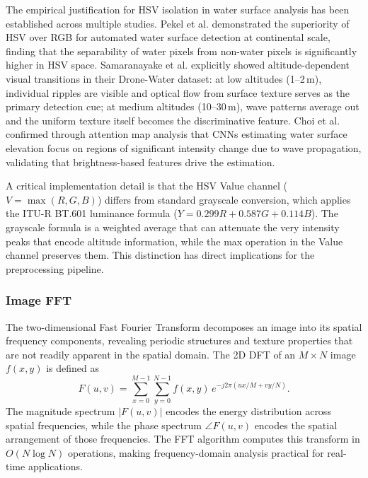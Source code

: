     The empirical justification for HSV isolation in water surface analysis has been established across multiple studies. Pekel et al. \cite{Pekel2016} demonstrated the superiority of HSV over RGB for automated water surface detection at continental scale, finding that the separability of water pixels from non-water pixels is significantly higher in HSV space. Samaranayake et al. \cite{SAMARANAYAKE2023103933} explicitly showed altitude-dependent visual transitions in their Drone-Water dataset: at low altitudes (1--2\,m), individual ripples are visible and optical flow from surface texture serves as the primary detection cue; at medium altitudes (10--30\,m), wave patterns average out and the uniform texture itself becomes the discriminative feature. Choi et al. \cite{CHEN2022110819} confirmed through attention map analysis that CNNs estimating water surface elevation focus on regions of significant intensity change due to wave propagation, validating that brightness-based features drive the estimation.

    A critical implementation detail is that the HSV Value channel ($V = \max(R, G, B)$) differs from standard grayscale conversion, which applies the ITU-R BT.601 luminance formula ($Y = 0.299R + 0.587G + 0.114B$). The grayscale formula is a weighted average that can attenuate the very intensity peaks that encode altitude information, while the max operation in the Value channel preserves them. This distinction has direct implications for the preprocessing pipeline.

    \subsubsection{Image FFT}

    The two-dimensional Fast Fourier Transform decomposes an image into its spatial frequency components, revealing periodic structures and texture properties that are not readily apparent in the spatial domain. The 2D DFT of an $M \times N$ image $f(x, y)$ is defined as
    \begin{equation}
        F(u, v) = \sum_{x=0}^{M-1} \sum_{y=0}^{N-1} f(x, y) \, e^{-j2\pi(ux/M + vy/N)} .
        \label{eq:2d_dft}
    \end{equation}
    The magnitude spectrum $|F(u, v)|$ encodes the energy distribution across spatial frequencies, while the phase spectrum $\angle F(u, v)$ encodes the spatial arrangement of those frequencies. The FFT algorithm \cite{CooleyTukey1965} computes this transform in $O(N \log N)$ operations, making frequency-domain analysis practical for real-time applications.

